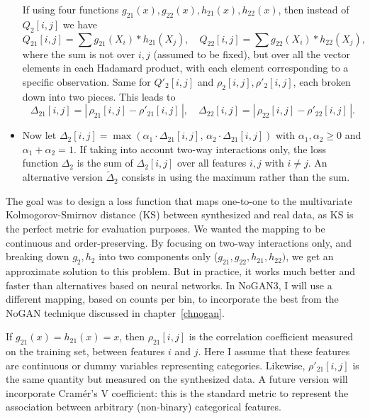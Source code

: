 \documentclass[oneside,10pt]{book}
\begin{document}
\begin{itemize}
If using four functions $g_{21}(x), g_{22}(x), h_{21}(x), h_{22}(x)$, then instead of $Q_2[i, j]$ we have %
$$Q_{21}[i,j] = \sum g_{21}(X_i) * h_{21}(X_j), \quad Q_{22}[i,j] = \sum g_{22}(X_i) * h_{22}(X_j),$$
 where the sum is not over $i, j$ (assumed to be fixed), but over all the vector elements in each Hadamard product, with each element corresponding to a specific observation.
 Same for $Q'_2[i, j]$ and $\rho_2[i,j], \rho'_2[i, j]$, each broken down into two pieces. This leads to
$$\Delta_{21}[i, j] = |\,\rho_{21}[i, j] - \rho'_{21}[i, j]\,|, \quad \Delta_{22}[i, j]=|\,\rho_{22}[i, j] - \rho'_{22}[i, j]\,|.$$
\item Now let $\Delta_2[i, j] = \max(\alpha_1 \cdot\Delta_{21}[i, j], \, \alpha_2  \cdot\Delta_{21}[i, j])$ with $\alpha_1,\alpha_2\geq 0$ and 
 $\alpha_1 + \alpha_2 = 1$. If taking into account two-way interactions only, the \textcolor{index}{loss function} $\Delta_2$ is the sum of 
 $\Delta_2[i, j]$ over all features $i, j$ with $i\neq j$. An alternative version $\widetilde{\Delta}_2$ consists in using the maximum rather than the sum.
\end{itemize}\vspace{1ex}

\noindent The goal was to design a loss function that maps one-to-one to the multivariate 
\textcolor{index}{Kolmogorov-Smirnov distance} (KS) between synthesized and real data, as 
 KS is the perfect metric for evaluation purposes. We wanted the mapping to be continuous and order-preserving. By focusing on two-way interactions only, and breaking down $g_2, h_2$ into two components only
 ($g_{21}, g_{22}, h_{21}, h_{22})$, we get an approximate solution to this problem. But in practice, it works much better and faster than alternatives based on neural networks. In NoGAN3, I will use a different mapping, based on counts per bin, to incorporate the best from the NoGAN technique discussed in chapter~\ref{chnogan}. 

If $g_{21}(x) = h_{21}(x) = x$, then $\rho_{21}[i, j]$ is the correlation coefficient measured on the training set, between features $i$ and $j$.
 Here I assume that these features are continuous or 
\textcolor{index}{dummy  variables} representing categories. Likewise, $\rho'_{21}[i, j]$ is the same quantity
 but measured on the synthesized data.
A future version will incorporate
\textcolor{index}{Cramér's V} coefficient: this is the standard metric to represent the association between arbitrary (non-binary) 
\textcolor{index}{categorical features}.
\end{document}
